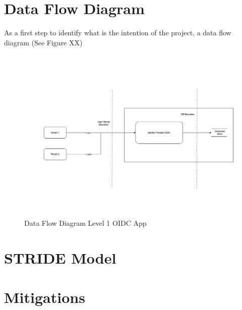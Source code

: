 \section{Data Flow Diagram}
As a first step to identify what is the intention of the project, a data flow diagram (See Figure XX)

\begin{figure}[h!]
\centering
\caption{Data Flow Diagram Level 1 OIDC App}\label{fig:dfd_app}
\includegraphics[width=\textwidth, height=320px]{pics/DFD_APP.png}
\end{figure}

\section{STRIDE Model}


\section{Mitigations}